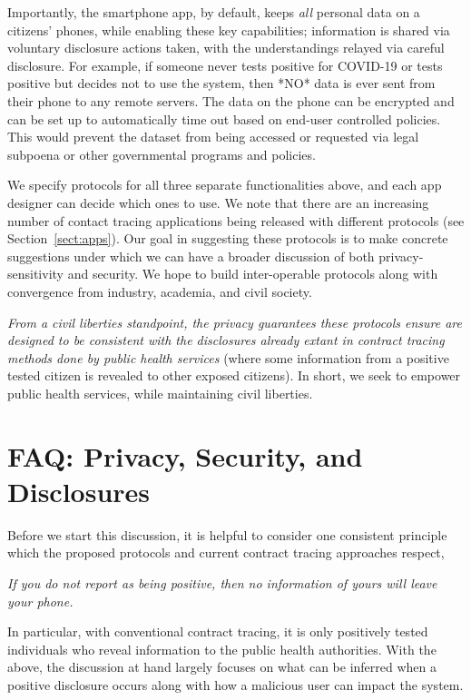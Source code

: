 \documentclass{article}
\begin{document}
Importantly, the smartphone app, by default, keeps \emph{all} personal data on a citizens' phones, while enabling these key capabilities; information is shared via voluntary disclosure actions taken, with the understandings relayed via careful disclosure. For example, if someone never tests positive for COVID-19 or tests positive but decides not to use the system, then *NO* data is ever sent from their phone to any remote servers. The data on the phone can be encrypted and can be set up to automatically time out based on end-user controlled policies.  This would prevent the dataset from being accessed or requested via legal subpoena or other governmental programs and policies.

 We specify protocols for all three separate functionalities above, and each app designer can decide which ones to use. We note that there are an increasing number of contact tracing applications being released with different protocols (see Section~\ref{sect:apps}). Our goal in suggesting these protocols is to make concrete suggestions under which we can have a broader discussion of both privacy-sensitivity and security. We hope to build inter-operable protocols along with convergence from industry, academia, and civil society.
 
 \emph{From a civil liberties standpoint, the privacy guarantees these protocols ensure are designed to be consistent with the disclosures already extant in contract tracing methods done by public health services} (where some information from a positive tested citizen is revealed to other exposed citizens). In short, we seek to empower public health services, while maintaining civil liberties.

\section{FAQ: Privacy, Security, and Disclosures} \label{sect:FAQ}

Before we start this discussion, it is helpful to consider one consistent principle which the proposed protocols and current contract tracing approaches respect,

\begin{center}
\emph{If you do not report as being positive, then no information of yours will leave your phone.}
\end{center}

In particular, with conventional contract tracing, it is only positively tested individuals who reveal information to the public health authorities. With the above, the discussion at hand largely focuses on what can be inferred when a positive disclosure occurs along with how a malicious user can impact the system.
\end{document}
